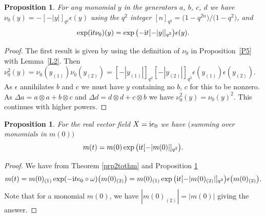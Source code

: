 \documentclass[10pt,a4paper]{amsart}
\numberwithin{equation}{section}
\newtheorem{Proposition}[Theorem]{Proposition}
 { \theoremstyle{definition}
\newtheorem{Definition}[Theorem]{Definition}
\newtheorem{Note}[Theorem]{Note}
\newtheorem{Example}[Theorem]{Example}
\newtheorem{Remark}[Theorem]{Remark} }
\newcommand{\tens}{\mathop{\otimes}}
\newcommand{\<}{\langle}
\renewcommand{\>}{\rangle}
\begin{document}
\begin{Proposition}\label{P4}
For any monomial $ y $ in the generators $ a$, $b$, $c$, $d $ we have $ \nu_{0}(y)=-[-|y|]_{q^{2}} \epsilon (y) $ using the $ q^{2} $ integer $ [n]_{q^{2}}= \big(1-q^{2n}\big)/\big(1-q^{2}\big) $, and
	\[\exp ({\rm i} t \nu_{0})(y)=\exp\big({-}{\rm i} t[-|y|]_{q^{2}}\big) \epsilon(y).\]
\end{Proposition}
\begin{proof}
	The first result is given by using the definition of $ \nu_{0} $ in Proposition~\ref{P5} with Lemma~\ref{L2}. Then $ \nu_{0}^{2}(y)=\nu_{0}(y_{(1)}) \nu_{0} (y_{(2)})= [-|y_{(1)}|]_{q^{2}} [-|y_{(2)}|]_{q^{2}} \epsilon(y_{(1)}) \epsilon(y_{(2)})$. As $ \epsilon $ annihilates $ b $ and $ c $ we must have $ y $ containing no $ b$, $c $ for this to be nonzero. As $ \Delta a= a \tens a +b \tens c$ and $ \Delta d= d\tens d+c \tens b$ we have $ \nu_{0}^{2}(y)=\nu_{0}(y)^{2} $. This continues with higher powers.
\end{proof}
\begin{Proposition}
	For the real vector field $ X={\rm i}e_{0} $ we have $($summing over monomials in $ m(0))$
	\[m(t)=m(0)\exp \big({\rm i}t [-|m(0)|]_{q^{2}}\big).\]
\end{Proposition}
\begin{proof}
	We have from Theorem \ref{prp2tothm} and Proposition \ref{P4}
\[
		m(t)=m(0)_{(1)} \exp (-{\rm i}t e_{0} \circ \omega)\big(m(0)_{(2)}\big)=m(0)_{(1)} \exp \big({\rm i}t [-|m(0)_{(2)}|]_{q^{2}}\big) \epsilon \big(m(0)_{(2)}\big).
\]
	Note that for a monomial $ m(0) $, we have $ |m(0)_{(2)}|=|m(0)| $ giving the answer.
\end{proof}
\end{document}
